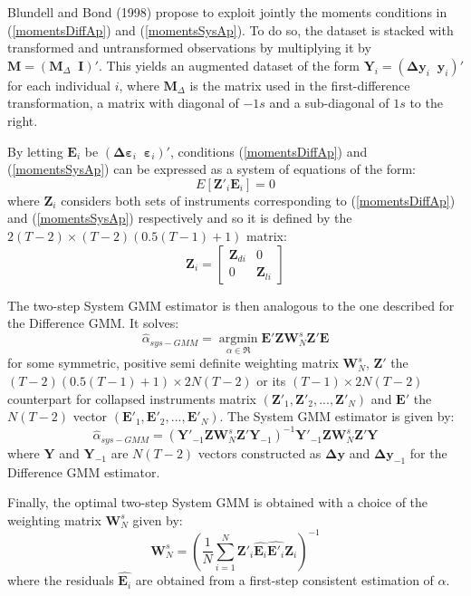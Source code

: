 \documentclass[12pt,a4paper,english]{article}%
\begin{document}
Blundell and Bond (1998) propose to exploit jointly the moments conditions in (\ref{momentsDiffAp}) and (\ref{momentsSysAp}). To do so, the dataset is stacked with transformed and untransformed observations by multiplying it by $\mathbf{M}=\left(\mathbf{M}_{\Delta}\;\;\mathbf{I}\right)'$. This yields an augmented dataset of the form $ \mathbf{Y}_{i}=\left(\mathbf{\Delta} \mathbf{y}_{i}\;\;\mathbf{y}_i\right)'$ for each individual $i$, where $\mathbf{M}_{\Delta}$ is the matrix used in the first-difference transformation, a matrix with diagonal of $-1s$ and a sub-diagonal of $1s$ to the right. 

By letting $\mathbf{E}_i$ be $\left(\mathbf{\Delta} \mathbf{\varepsilon}_{i}\;\;\mathbf{\varepsilon}_i\right)'$, conditions (\ref{momentsDiffAp}) and (\ref{momentsSysAp}) can be expressed as a system of equations of the form:
\begin{equation*}
E\left[ \mathbf{Z}'_{i}\mathbf{E}_{i}\right]=0
\end{equation*}
where $\mathbf{Z}_{i}$ considers both sets of instruments corresponding to (\ref{momentsDiffAp}) and (\ref{momentsSysAp}) respectively and so it is defined by the $2(T-2)\times (T-2)(0.5(T-1)+1)$ matrix:
\[{\mathbf{Z}_i} = \left[ {\begin{array}{*{20}{c}}
{{\mathbf{Z}_{di}}}&0\\
0&{{\mathbf{Z}_{li}}}
\end{array}} \right]\]

The two-step System GMM estimator is then analogous to the one described for the Difference GMM. It solves:
\[
{{\hat \alpha }_{sys - GMM}} = \mathop {\arg \min }\limits_{\alpha  \in \Re } \mathbf{E}' \mathbf{Z}{\mathbf{W}_{N}^s}\mathbf{Z}'\mathbf{E} 
\]
for some symmetric, positive semi definite weighting matrix $\mathbf{W}_{N}^s$, $\mathbf{Z}'$ the $(T-2)(0.5(T-1)+1)\times 2N(T-2)$ or its $(T-1)\times 2N(T-2)$ counterpart for collapsed instruments matrix $(\mathbf{Z}'_{1},\mathbf{Z}'_{2},...,\mathbf{Z}'_{N})$ and $\mathbf{E}'$ the $N(T-2)$ vector $(\mathbf{E}'_1,\mathbf{E}'_2,...,\mathbf{E}'_N)$. The System GMM estimator is given by:
\[
{{\hat \alpha }_{sys - GMM}} = {\left( \mathbf{Y}'_{-1}\mathbf{Z} \mathbf{W}_{N}^s \mathbf{Z}' \mathbf{Y}_{-1} \right)^{ - 1}} \mathbf{Y}'_{-1}\mathbf{Z} \mathbf{W}_{N}^s \mathbf{Z}' \mathbf{Y} 
\]
where $\mathbf{Y}$ and $\mathbf{Y}_{-1}$ are $N(T-2)$ vectors constructed as $\mathbf{\Delta y}$ and $\mathbf{\Delta y}_{-1}$ for the Difference GMM estimator.

Finally, the optimal two-step System GMM is obtained with a choice of the weighting matrix $\mathbf{W}_{N}^s$ given by:
\[
\mathbf{W}_{N}^s=\left( \frac{1}{N} \sum\limits_{i=1}^{N} \mathbf{Z}'_{i} \hat{ \mathbf{E}_i} \hat{ \mathbf{E}'_i} \mathbf{Z}_{i} \right)^{-1}
\]
where the residuals $\hat{ \mathbf{E}_i}$ are obtained from a first-step consistent estimation of $\alpha$.
\end{document}
